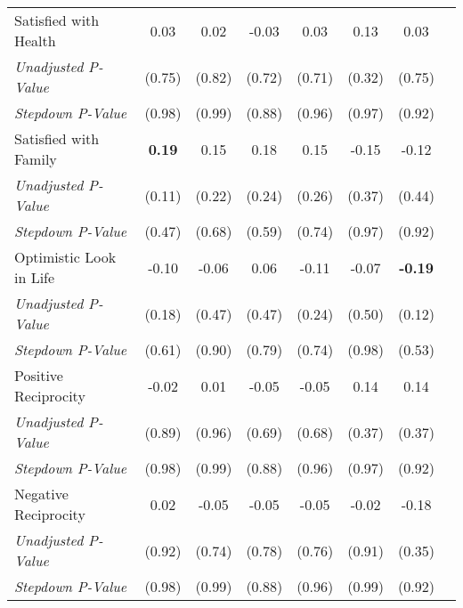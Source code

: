 \begin{tabular}{l c c c c c c c}
Satisfied with Health & 0.03 & 0.02 & -0.03 & 0.03 & 0.13 & 0.03 \\
\quad \textit{Unadjusted P-Value} & (0.75) & (0.82) & (0.72) & (0.71) & (0.32) & (0.75) \\
\quad \textit{Stepdown P-Value} & (0.98) & (0.99) & (0.88) & (0.96) & (0.97) & (0.92) \\
Satisfied with Family & \textbf{ 0.19 } & 0.15 & 0.18 & 0.15 & -0.15 & -0.12 \\
\quad \textit{Unadjusted P-Value} & (0.11) & (0.22) & (0.24) & (0.26) & (0.37) & (0.44) \\
\quad \textit{Stepdown P-Value} & (0.47) & (0.68) & (0.59) & (0.74) & (0.97) & (0.92) \\
Optimistic Look in Life & -0.10 & -0.06 & 0.06 & -0.11 & -0.07 & \textbf{ -0.19 } \\
\quad \textit{Unadjusted P-Value} & (0.18) & (0.47) & (0.47) & (0.24) & (0.50) & (0.12) \\
\quad \textit{Stepdown P-Value} & (0.61) & (0.90) & (0.79) & (0.74) & (0.98) & (0.53) \\
Positive Reciprocity & -0.02 & 0.01 & -0.05 & -0.05 & 0.14 & 0.14 \\
\quad \textit{Unadjusted P-Value} & (0.89) & (0.96) & (0.69) & (0.68) & (0.37) & (0.37) \\
\quad \textit{Stepdown P-Value} & (0.98) & (0.99) & (0.88) & (0.96) & (0.97) & (0.92) \\
Negative Reciprocity & 0.02 & -0.05 & -0.05 & -0.05 & -0.02 & -0.18 \\
\quad \textit{Unadjusted P-Value} & (0.92) & (0.74) & (0.78) & (0.76) & (0.91) & (0.35) \\
\quad \textit{Stepdown P-Value} & (0.98) & (0.99) & (0.88) & (0.96) & (0.99) & (0.92) \\
\bottomrule
\end{tabular}
